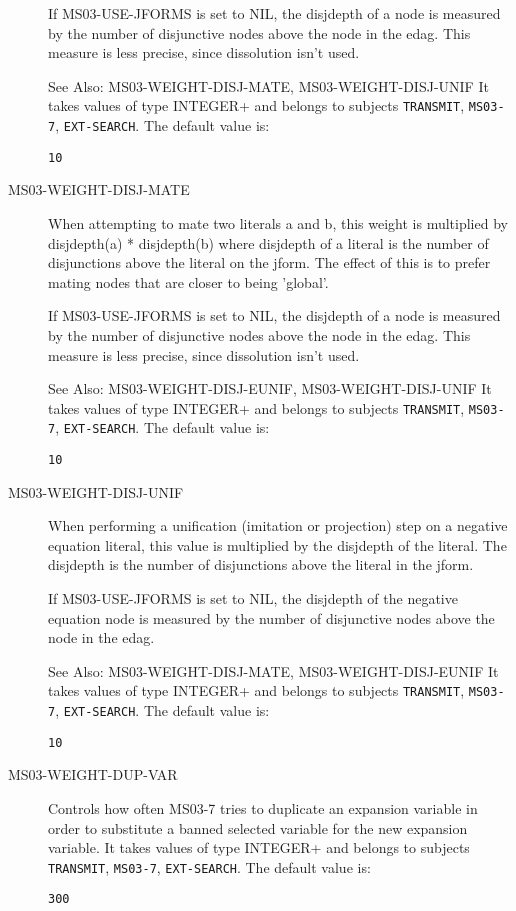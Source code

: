\begin{description}
If MS03-USE-JFORMS is set to NIL, the disjdepth of a node is
measured by the number of disjunctive nodes above the node in the edag.
This measure is less precise, since dissolution isn't used.

See Also: MS03-WEIGHT-DISJ-MATE, MS03-WEIGHT-DISJ-UNIF
It takes values of type INTEGER+ and belongs to subjects \texttt{TRANSMIT}, \texttt{MS03-7}, \texttt{EXT-SEARCH}.  The default value is: \begin{lstlisting}
10
\end{lstlisting}

\item[MS03-WEIGHT-DISJ-MATE]  
When attempting to mate two literals a and b, this weight is
multiplied by disjdepth(a) * disjdepth(b) where disjdepth of a literal
is the number of disjunctions above the literal on the jform.
The effect of this is to prefer mating nodes that are closer to being 'global'.

If MS03-USE-JFORMS is set to NIL, the disjdepth of a node is
measured by the number of disjunctive nodes above the node in the edag.
This measure is less precise, since dissolution isn't used.

See Also: MS03-WEIGHT-DISJ-EUNIF, MS03-WEIGHT-DISJ-UNIF
It takes values of type INTEGER+ and belongs to subjects \texttt{TRANSMIT}, \texttt{MS03-7}, \texttt{EXT-SEARCH}.  The default value is: \begin{lstlisting}
10
\end{lstlisting}

\item[MS03-WEIGHT-DISJ-UNIF]  
When performing a unification (imitation or projection) step
on a negative equation literal, this value is multiplied by the
disjdepth of the literal.  The disjdepth is the number of disjunctions
above the literal in the jform.

If MS03-USE-JFORMS is set to NIL, the disjdepth of the negative equation
node is measured by the number of disjunctive nodes above the node in the edag.

See Also: MS03-WEIGHT-DISJ-MATE, MS03-WEIGHT-DISJ-EUNIF
It takes values of type INTEGER+ and belongs to subjects \texttt{TRANSMIT}, \texttt{MS03-7}, \texttt{EXT-SEARCH}.  The default value is: \begin{lstlisting}
10
\end{lstlisting}

\item[MS03-WEIGHT-DUP-VAR]  
Controls how often MS03-7 tries to duplicate an expansion variable in
order to substitute a banned selected variable for the new expansion
variable.
It takes values of type INTEGER+ and belongs to subjects \texttt{TRANSMIT}, \texttt{MS03-7}, \texttt{EXT-SEARCH}.  The default value is: \begin{lstlisting}
300
\end{lstlisting}


\end{description}
